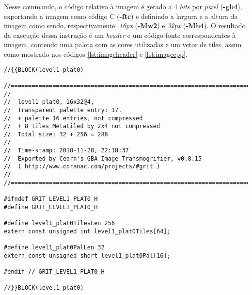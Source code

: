 Nesse commando, o código relativo à imagem é gerado a 4 \textit{bits} por \textit{pixel} (\textbf{-gb4}), exportando a imagem como código C (\textbf{-ftc}) e definindo a largura e a altura da imagem como sendo, respectivamente, \textit{16px} (\textbf{-Mw2}) e \textit{32px} (\textbf{-Mh4}). O resultado da execução dessa instrução é um \textit{header} e um código-fonte correspondentes à imagem, contendo uma paleta com as cores utilizadas e um vetor de tiles, assim como mostrado nos códigos \ref{lst:imageheader} e \ref{lst:imagecpp}.


\begin{lstlisting}[caption={Cabeçalho da parte superior da imagem da plataforma da primeira fase.},label={lst:imageheader}]
//{{BLOCK(level1_plat0)

//======================================================================
//
//  level1_plat0, 16x32@4,
//  Transparent palette entry: 17.
//  + palette 16 entries, not compressed
//  + 8 tiles Metatiled by 2x4 not compressed
//  Total size: 32 + 256 = 288
//
//  Time-stamp: 2018-11-28, 22:18:37
//  Exported by Cearn's GBA Image Transmogrifier, v0.8.15
//  ( http://www.coranac.com/projects/#grit )
//
//======================================================================

#ifndef GRIT_LEVEL1_PLAT0_H
#define GRIT_LEVEL1_PLAT0_H

#define level1_plat0TilesLen 256
extern const unsigned int level1_plat0Tiles[64];

#define level1_plat0PalLen 32
extern const unsigned short level1_plat0Pal[16];

#endif // GRIT_LEVEL1_PLAT0_H

//}}BLOCK(level1_plat0)
\end{lstlisting}


